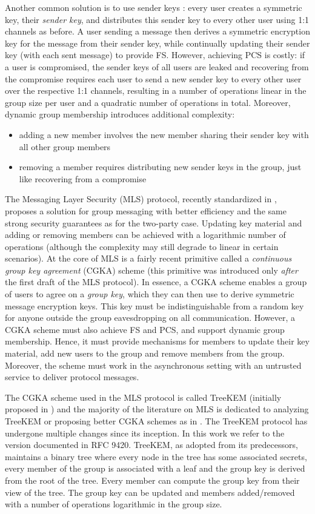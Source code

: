 Another common solution is to use sender keys \cite{sender-keys}: every user creates a symmetric key, their \emph{sender key}, and distributes this sender key to every other user using 1:1 channels as before. A user sending a message then derives a symmetric encryption key for the message from their sender key, while continually updating their sender key (with each sent message) to provide FS. However, achieving PCS is costly: if a user is compromised, the sender keys of all users are leaked and recovering from the compromise requires each user to send a new sender key to every other user over the respective 1:1 channels, resulting in a number of operations linear in the group size per user and a quadratic number of operations in total. Moreover, dynamic group membership introduces additional complexity:
\begin{itemize}
	\item adding a new member involves the new member sharing their sender key with all other group members
	\item removing a member requires distributing new sender keys in the group, just like recovering from a compromise
\end{itemize}
The Messaging Layer Security (MLS) protocol, recently standardized in \cite{rfc9420}, proposes a solution for group messaging with better efficiency and the same strong security guarantees as for the two-party case. Updating key material and adding or removing members can be achieved with a logarithmic number of operations (although the complexity may still degrade to linear in certain scenarios). At the core of MLS is a fairly recent primitive called a \emph{continuous group key agreement} (CGKA) scheme \cite{rtreekem} (this primitive was introduced only \emph{after} the first draft of the MLS protocol). In essence, a CGKA scheme enables a group of users to agree on a \emph{group key}, which they can then use to derive symmetric message encryption keys. This key must be indistinguishable from a random key for anyone outside the group eavesdropping on all communication. However, a CGKA scheme must also achieve FS and PCS, and support dynamic group membership. Hence, it must provide mechanisms for members to update their key material, add new users to the group and remove members from the group. Moreover, the scheme must work in the asynchronous setting with an untrusted service to deliver protocol messages.

The CGKA scheme used in the MLS protocol is called TreeKEM (initially proposed in \cite{treekem}) and the majority of the literature on MLS is dedicated to analyzing TreeKEM or proposing better CGKA schemes as in \cite{ttkem,rtreekem,insider-security,modular-group-messaging}. The TreeKEM protocol has undergone multiple changes since its inception. In this work we refer to the version documented in RFC 9420. TreeKEM, as adopted from its predecessors, maintains a binary tree where every node in the tree has some associated secrets, every member of the group is associated with a leaf and the group key is derived from the root of the tree. Every member can compute the group key from their view of the tree. The group key can be updated and members added/removed with a number of operations logarithmic in the group size.

